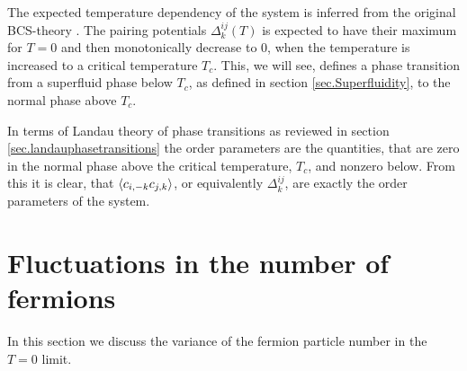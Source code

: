 The expected temperature dependency of the system is inferred from the original BCS-theory \cite[chapter 3]{Tinkham}. The pairing potentials $\Delta^{ij}_k(T)$ is expected to have their maximum for $T = 0$ and then monotonically decrease to 0, when the temperature is increased to a critical temperature $T_c$. This, we will see, defines a phase transition from a superfluid phase below $T_c$, as defined in section \ref{sec.Superfluidity}, to the normal phase above $T_c$. 

In terms of Landau theory of phase transitions as reviewed in section \ref{sec.landauphasetransitions} the order parameters are the quantities, that are zero in the normal phase above the critical temperature, $T_c$, and nonzero below. From this it is clear, that $\braket{c_{i,-k}c_{j,k}}$, or equivalently $\Delta^{ij}_k$, are exactly the order parameters of the system.

\section{Fluctuations in the number of fermions} \label{sec.fluctuation.fermionnumber}
In this section we discuss the variance of the fermion particle number in the $T = 0$ limit. 

